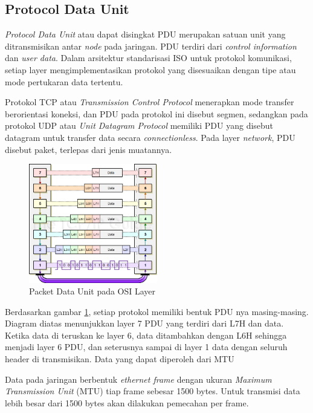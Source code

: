 \documentclass[./skripsi.tex]{subfiles}
\begin{document}
\subsection{Protocol Data Unit}
\par \textit{Protocol Data Unit} atau dapat disingkat PDU merupakan satuan unit yang ditransmisikan antar \textit{node} pada jaringan. PDU terdiri dari \textit{control information} dan \textit{user data}. Dalam arsitektur standarisasi ISO untuk protokol komunikasi, setiap layer mengimplementasikan protokol yang disesuaikan dengan tipe atau mode pertukaran data tertentu.
\par Protokol TCP atau \textit{Transmission Control Protocol} menerapkan mode transfer berorientasi koneksi, dan PDU pada protokol ini disebut segmen, sedangkan pada protokol UDP atau \textit{Unit Datagram Protocol} memiliki PDU yang disebut datagram untuk transfer data secara \textit{connectionless}. Pada layer \textit{network}, PDU disebut paket, terlepas dari jenis muatannya.
\begin{figure}%
    \centering
    \includegraphics[width=0.5\textwidth]{public/assets/img/osidataenkapsulasi.png}
    \caption{Packet Data Unit pada OSI Layer}
    \label{fig:pduosi}
\end{figure}
\par Berdasarkan gambar \ref{fig:pduosi}, setiap protokol memiliki bentuk PDU nya masing-masing. Diagram diatas menunjukkan layer 7 PDU yang terdiri dari L7H dan data. Ketika data di teruskan ke layer 6, data ditambahkan dengan L6H sehingga menjadi layer 6 PDU, dan seterusnya sampai di layer 1 data dengan seluruh header di transmisikan. Data yang dapat diperoleh dari MTU
\par Data pada jaringan berbentuk \textit{ethernet frame} dengan ukuran \textit{Maximum Transmission Unit} (MTU) tiap frame sebesar 1500 bytes. Untuk transmisi data lebih besar dari 1500 bytes akan dilakukan pemecahan per frame.
\end{document}
